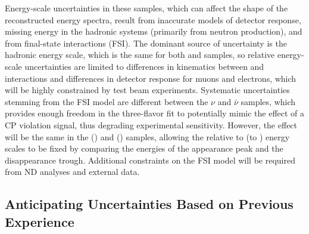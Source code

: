 
Energy-scale uncertainties in these samples, which can affect the shape of the reconstructed energy spectra,
result from
inaccurate models of detector response, missing energy in the hadronic systems (primarily from neutron production),
and from final-state interactions (FSI). The dominant source of uncertainty is the hadronic energy scale,
which is the same for both \nue and \numu samples, so relative energy-scale uncertainties are limited to
differences in kinematics between \numu and \nue interactions and differences in detector response for
muons and electrons, which will be highly constrained by test beam experiments.
Systematic uncertainties stemming from the FSI model are different
between the $\nu$ and $\bar\nu$ samples, which provides enough freedom in the three-flavor fit to
potentially mimic the effect of a CP violation signal, thus degrading experimental sensitivity.
However, the effect will be the same in the \nue (\anue) and \numu
(\anumu) samples, allowing the relative \nue to \numu (\anue to \anumu) energy scales to be fixed by comparing
the energies of the appearance peak and the disappearance trough. Additional constraints on the FSI 
model will be required from ND analyses and external data.

\subsection{Anticipating Uncertainties Based on Previous Experience}

